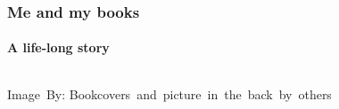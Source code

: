 \begin{frame}
	\frametitle{Me and my books}
	\framesubtitle{A life-long story}

	\begin{columns}
			\begin{center}
				\hspace*{15pt}\hbox{\scriptsize Image By:}
				\hspace*{15pt}\hbox{\scriptsize Bookcovers and picture in the back by others}

\end{center}
\end{columns}
\end{frame}
